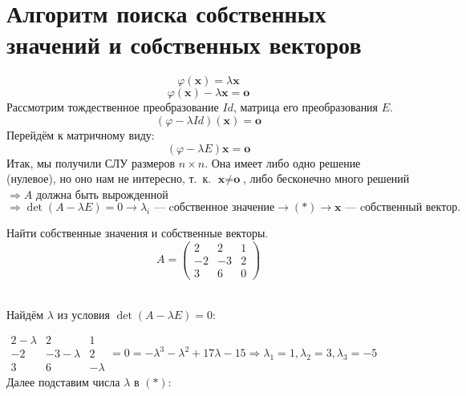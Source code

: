 \section{Алгоритм поиска собственных значений и собственных векторов}
\vspace{-0.5cm}
$$\varphi(\textbf{x}) = \lambda \textbf{x}$$
$$\varphi(\textbf{x}) - \lambda \textbf{x} = \textbf{o}$$
Рассмотрим тождественное преобразование $Id$, матрица его преобразования $E$. %
$$(\varphi -\lambda Id)(\textbf{x})=\textbf{o}$$
Перейдём к матричному виду:
\begin{equation}
(\varphi -\lambda E)\textbf{x}=\textbf{o} \tag{$*$}
\end{equation}
Итак, мы получили СЛУ размеров $n\times n$. Она имеет либо одно решение (нулевое), но оно нам не интересно, т.~к. $\textbf{x}\neq\textbf{o}$, либо бесконечно много решений $\Rightarrow A$ должна быть вырожденной $\Rightarrow \det(A-\lambda E) = 0 \rightarrow \lambda_i\text{ --- cобственное значение} \rightarrow (*) \rightarrow \textbf{x}\text{ --- cобственный вектор}.$ %
\begin{prim}
	Найти собственные значения и собственные векторы.\\
	$$A = \left( \begin{array}{rrr}
	2 & 2 & 1  \\
	-2 & -3& 2\\
	3&6&0
	\end{array}\right)
	$$
\end{prim}\\

Найдём $\lambda$ из условия $\det(A-\lambda E) = 0$:

$\begin{array}{|ccc|}
2-\lambda & 2 & 1  \\
-2 & -3 -\lambda& 2\\
3&6&-\lambda
\end{array} = 0 = -\lambda^3- \lambda^2+17\lambda -15 \Rightarrow \lambda_1 =1, \lambda_2 =3, \lambda_3 = -5$\\
Далее подставим числа $\lambda$ в $(*)$:

